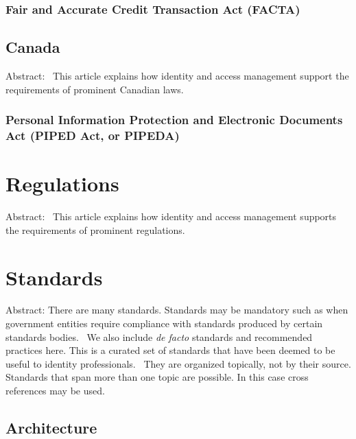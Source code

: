 \hypertarget{fair-and-accurate-credit-transaction-act-facta}{%
\subsubsection{Fair and Accurate Credit Transaction Act
(FACTA)}\label{fair-and-accurate-credit-transaction-act-facta}}

\hypertarget{canada}{%
\subsection{Canada}\label{canada}}

Abstract:~ This article explains how identity and access management
support the requirements of prominent Canadian laws.

\hypertarget{personal-information-protection-and-electronic-documents-act-piped-act-or-pipeda}{%
\subsubsection{Personal Information Protection and Electronic Documents Act
(PIPED Act, or
PIPEDA)}\label{personal-information-protection-and-electronic-documents-act-piped-act-or-pipeda}}

\hypertarget{regulations}{%
\section{Regulations}\label{regulations}}

Abstract:~ This article explains how identity and access management
supports the requirements of prominent regulations.

\hypertarget{standards}{%
\section{Standards}\label{standards}}

Abstract: There are many standards. Standards may be mandatory such as
when government entities require compliance with standards produced by
certain standards bodies.~ We also include \emph{de facto} standards and
recommended practices here. This is a curated set of standards that have
been deemed to be useful to identity professionals.~ They are organized
topically, not by their source. Standards that span more than one topic
are possible. In this case cross references may be used.

\hypertarget{architecture}{%
\subsection{Architecture}\label{architecture}}

